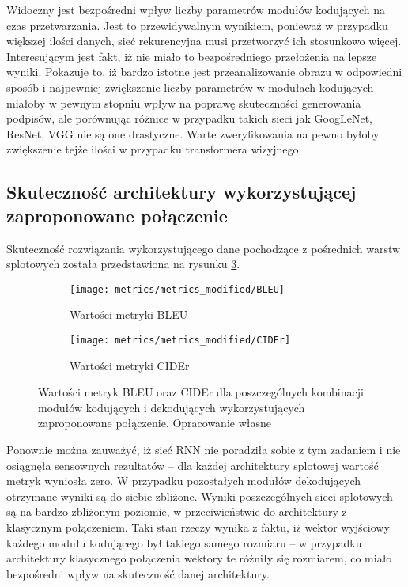 \noindent Widoczny jest bezpośredni wpływ liczby parametrów modułów kodujących na czas przetwarzania. Jest to przewidywalnym wynikiem, ponieważ w przypadku większej ilości danych, sieć rekurencyjna musi przetworzyć ich stosunkowo więcej. Interesującym jest fakt, iż nie miało to bezpośredniego przełożenia na lepsze wyniki. Pokazuje to, iż bardzo istotne jest przeanalizowanie obrazu w odpowiedni sposób i najpewniej zwiększenie liczby parametrów w modułach kodujących miałoby w pewnym stopniu wpływ na poprawę skuteczności generowania podpisów, ale porównując różnice w przypadku takich sieci jak GoogLeNet, ResNet, VGG nie są one drastyczne. Warte zweryfikowania na pewno byłoby zwiększenie tejże ilości w przypadku transformera wizyjnego.
\subsection{Skuteczność architektury wykorzystującej zaproponowane połączenie}
Skuteczność rozwiązania wykorzystującego dane pochodzące z pośrednich warstw splotowych została przedstawiona na rysunku \ref{fig:metrics-modified}.
\begin{figure}[H]
    \centering
    \begin{subfigure}{.5\textwidth}
        \centering
        \texttt{[image: metrics/metrics\_modified/BLEU]}
        \caption{Wartości metryki BLEU}
        \label{fig:bleu-modified}
    \end{subfigure}%
    \centering
    \begin{subfigure}{.5\textwidth}
        \centering
        \texttt{[image: metrics/metrics\_modified/CIDEr]}
        \caption{Wartości metryki CIDEr}
        \label{fig:cider-modified}
    \end{subfigure}%
    \caption{Wartości metryk BLEU oraz CIDEr dla poszczególnych kombinacji modułów kodujących i dekodujących wykorzystujących zaproponowane połączenie. Opracowanie własne}
    \label{fig:metrics-modified}
\end{figure}
\noindent Ponownie można zauważyć, iż sieć RNN nie poradziła sobie z tym zadaniem i nie osiągnęła sensownych rezultatów -- dla każdej architektury splotowej wartość metryk wyniosła zero. W przypadku pozostałych modułów dekodujących otrzymane wyniki są do siebie zbliżone. Wyniki poszczególnych sieci splotowych są na bardzo zbliżonym poziomie, w przeciwieństwie do architektury z klasycznym połączeniem. Taki stan rzeczy wynika z faktu, iż wektor wyjściowy każdego modułu kodującego był takiego samego rozmiaru -- w przypadku architektury klasycznego połączenia wektory te różniły się rozmiarem, co miało bezpośredni wpływ na skuteczność danej architektury.

